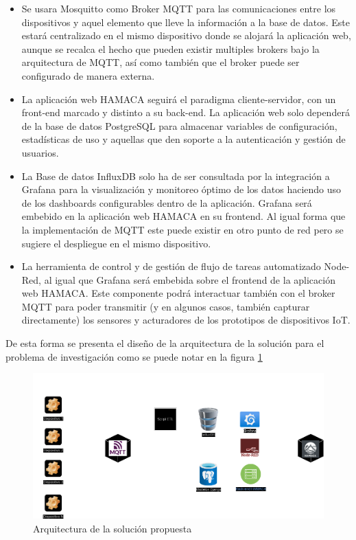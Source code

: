 \begin{itemize}

\item Se usara Mosquitto como Broker MQTT para las comunicaciones entre los dispositivos y aquel elemento que lleve la información a la base de datos. Este estará centralizado en el mismo dispositivo donde se alojará la aplicación web, aunque se recalca el hecho que pueden existir multiples brokers bajo la arquitectura de MQTT, así como también que el broker puede ser configurado de manera externa.


\item La aplicación web HAMACA seguirá el paradigma cliente-servidor, con un front-end marcado y distinto a su back-end. La aplicación web solo dependerá de la base de datos PostgreSQL para almacenar variables de configuración, estadísticas de uso y aquellas que den soporte a la autenticación y gestión de usuarios.


\item La Base de datos InfluxDB solo ha de ser consultada por la integración a Grafana para la visualización y monitoreo óptimo de los datos haciendo uso de los dashboards configurables dentro de la aplicación. Grafana será embebido en la aplicación web HAMACA en su frontend. Al igual forma que la implementación de MQTT este puede existir en otro punto de red pero se sugiere el despliegue en el mismo dispositivo. 

\item La herramienta de control y de gestión de flujo de tareas automatizado Node-Red, al igual que Grafana será embebida sobre el frontend de la aplicación web HAMACA. Este componente podrá interactuar también con el broker MQTT para poder transmitir (y en algunos casos, también capturar directamente) los sensores y acturadores de los prototipos de dispositivos IoT.

\end{itemize}
De esta forma se presenta el diseño de la arquitectura de la solución para el problema de investigación como se puede notar en la figura \ref{fig:arquitectura_hamaca}
\begin{figure}[!htb]
\centering
\includegraphics[scale=0.45]{./Figuras/arquitectura_hamaca.png}
\caption{Arquitectura de la solución propuesta}
\label{fig:arquitectura_hamaca}
\vspace*{-10pt}
\end{figure}

